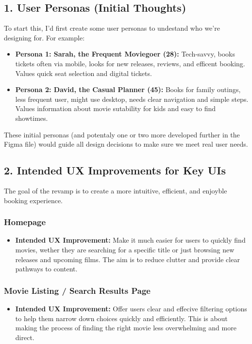 \documentclass[12pt,a4paper]{article}
\begin{document}
\subsection*{1. User Personas (Initial Thoughts)}
To start this, I'd first create some user personas to undestand who we're designing for. For example:
\begin{itemize}
    \item \textbf{Persona 1: Sarah, the Frequent Moviegoer (28):} Tech-savvy, books tickets often via mobile, looks for new releases, reviews, and efficent booking. Values quick seat selection and digital tickets.
    \item \textbf{Persona 2: David, the Casual Planner (45):} Books for family outings, less frequent user, might use desktop, needs clear navigation and simple steps. Values information about movie sutability for kids and easy to find showtimes.
\end{itemize}
These initial personas (and potentaly one or two more developed further in the Figma file) would guide all design decisions to make sure we meet real user needs.

\subsection*{2. Intended UX Improvements for Key UIs}
The goal of the revamp is to create a more intuitive, efficient, and enjoyble booking experience.

\subsubsection*{Homepage}
\begin{itemize}
    \item \textbf{Intended UX Improvement:} Make it much easier for users to quickly find movies, wether they are searching for a specific title or just browsing new releases and upcoming films. The aim is to reduce clutter and provide clear pathways to content.
\end{itemize}

\subsubsection*{Movie Listing / Search Results Page}
\begin{itemize}
    \item \textbf{Intended UX Improvement:} Offer users clear and effecive filtering options to help them narrow down choices quickly and efficiently. This is about making the process of finding the right movie less overwhelming and more direct.
\end{itemize}
\end{document}
